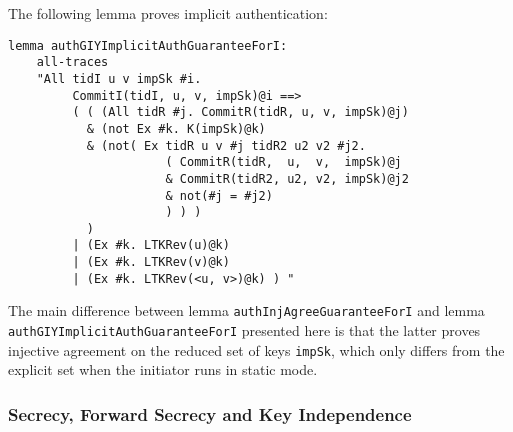 The following lemma proves implicit authentication:
\begin{lstlisting}
lemma authGIYImplicitAuthGuaranteeForI:
    all-traces
    "All tidI u v impSk #i.
         CommitI(tidI, u, v, impSk)@i ==>
         ( ( (All tidR #j. CommitR(tidR, u, v, impSk)@j)
           & (not Ex #k. K(impSk)@k)
           & (not( Ex tidR u v #j tidR2 u2 v2 #j2.
                      ( CommitR(tidR,  u,  v,  impSk)@j
                      & CommitR(tidR2, u2, v2, impSk)@j2
                      & not(#j = #j2)
                      ) ) )
           )
         | (Ex #k. LTKRev(u)@k)
         | (Ex #k. LTKRev(v)@k)
         | (Ex #k. LTKRev(<u, v>)@k) ) "
\end{lstlisting}

The main difference between lemma
\lstinline{authInjAgreeGuaranteeForI} and lemma\\
\lstinline{authGIYImplicitAuthGuaranteeForI} presented here is that
the latter proves injective agreement on the reduced set of keys
\lstinline{impSk}, which only differs from the explicit set when the
initiator runs in static mode.

\subsubsection{Secrecy, Forward Secrecy and Key Independence}





